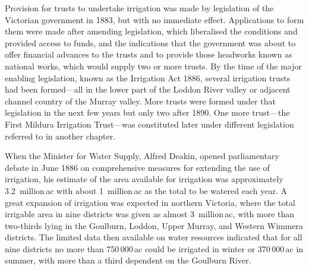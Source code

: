 Provision for trusts to undertake irrigation was made by legislation
of the Victorian government in 1883, but with no immediate effect.
Applications to form them were made after amending legislation, which
liberalised the conditions and provided access to funds, and the
indications that the government was about to offer financial advances
to the trusts and to provide those headworks known as national works,
which would supply two or more trusts.  By the time of the major
enabling legislation, known as the Irrigation Act 1886, several
irrigation trusts had been formed---all in the lower part of the
Loddon River valley or adjacent channel country of the Murray valley.
More trusts were formed under that legislation in the next few years
but only two after 1890.  One more trust---the First Mildura
Irrigation Trust---was constituted later under different legislation
referred to in another chapter.

When the Minister for Water Supply, Alfred Deakin, opened
parliamentary debate in June 1886 on comprehensive measures for
extending the use of irrigation, his estimate of the area available
for irrigation was approximately 3.2~million\,ac with about
1~million\,ac as the total to be watered each year.  A great expansion
of irrigation was expected in northern Victoria, where the total
irrigable area in nine districts was given as almost 3~million\,ac,
with more than two-thirds lying in the Goulburn, Loddon, Upper Murray,
and Western Wimmera districts.  The limited data then available on
water resources indicated that for all nine districts no more than
750\,000\,ac could be irrigated in winter or 370\,000\,ac in summer,
with more than a third dependent on the Goulburn River.

